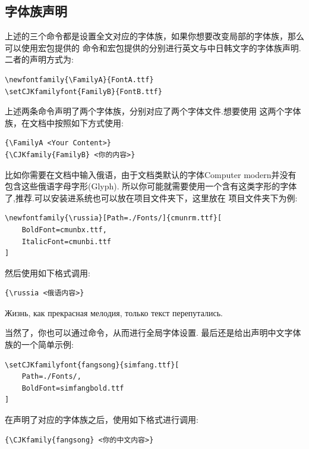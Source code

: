 \subsection{字体族声明}
上述的三个命令都是设置全文对应的字体族，如果你想要改变局部的字体族，那么可以使用宏包提供的
命令\cmd{\newfontfamily}和宏包提供的\cmd{\setCJKfamilyfont}分别进行英文与中日韩文字的字体族声明.
二者的声明方式为:
\begin{verbatim}
\newfontfamily{\FamilyA}{FontA.ttf}
\setCJKfamilyfont{FamilyB}{FontB.ttf}
\end{verbatim}

上述两条命令声明了两个字体族，分别对应了两个字体文件.想要使用
这两个字体族，在文档中按照如下方式使用:
\begin{verbatim}
{\FamilyA <Your Content>}
{\CJKfamily{FamilyB} <你的内容>}
\end{verbatim}

比如你需要在文档中输入俄语，由于文档类默认的字体Computer modern并没有包含这些俄语字母字形(Glyph).
所以你可能就需要使用一个含有这类字形的字体了,推荐.可以安装进系统也可以放在项目文件夹下，这里放在
项目文件夹下为例:
\begin{verbatim}
\newfontfamily{\russia}[Path=./Fonts/]{cmunrm.ttf}[
    BoldFont=cmunbx.ttf,
    ItalicFont=cmunbi.ttf
]
\end{verbatim}

然后使用如下格式调用:
\begin{verbatim}
{\russia <俄语内容>}
\end{verbatim}

\begin{leftbar}
{\russia Жизнь, как прекрасная мелодия, только текст перепутались.}\par 
{}
\end{leftbar}


当然了，你也可以通过\cmd{\setmainfont}命令，从而进行全局字体设置. 最后还是给出声明中文字体族的一个简单示例:
\begin{verbatim}
\setCJKfamilyfont{fangsong}{simfang.ttf}[
    Path=./Fonts/,
    BoldFont=simfangbold.ttf
]
\end{verbatim}

在声明了对应的字体族之后，使用如下格式进行调用:
\begin{verbatim}
{\CJKfamily{fangsong} <你的中文内容>}
\end{verbatim}

